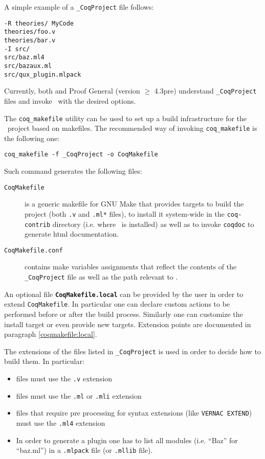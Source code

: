 A simple example of a {\tt \_CoqProject} file follows:

\begin{verbatim}
-R theories/ MyCode
theories/foo.v
theories/bar.v
-I src/
src/baz.ml4
src/bazaux.ml
src/qux_plugin.mlpack
\end{verbatim}

Currently, both \CoqIDE{} and Proof General (version $\geq$ 4.3pre) understand
{\tt \_CoqProject} files and invoke \Coq\ with the desired options.

The {\tt coq\_makefile} utility can be used to set up a build infrastructure
for the \Coq\ project based on makefiles.  The recommended way of
invoking {\tt coq\_makefile} is the following one:

\begin{verbatim}
coq_makefile -f _CoqProject -o CoqMakefile
\end{verbatim}

Such command generates the following files:
\begin{description}
	\item[{\tt CoqMakefile}] is a generic makefile for GNU Make that provides targets to build the project (both {\tt .v} and {\tt .ml*} files), to install it system-wide in the {\tt coq-contrib} directory (i.e. where \Coq\ is installed) as well as to invoke {\tt coqdoc} to generate html documentation.

	\item[{\tt CoqMakefile.conf}] contains make variables assignments that reflect the contents of the {\tt \_CoqProject} file as well as the path relevant to \Coq{}.
\end{description}

An optional file {\bf {\tt CoqMakefile.local}} can be provided by the user in order to extend {\tt CoqMakefile}.  In particular one can declare custom actions to be performed before or after the build process. Similarly one can customize the install target or even provide new targets.  Extension points are documented in paragraph \ref{coqmakefile:local}.

The extensions of the files listed in {\tt \_CoqProject} is
used in order to decide how to build them.  In particular:

\begin{itemize}
\item {\Coq} files must use the \texttt{.v} extension
\item {\ocaml} files must use the \texttt{.ml} or \texttt{.mli} extension
\item {\ocaml} files that require pre processing for syntax extensions (like {\tt VERNAC EXTEND}) must use the \texttt{.ml4} extension
\item In order to generate a plugin one has to list all {\ocaml} modules (i.e. ``Baz'' for ``baz.ml'') in a \texttt{.mlpack} file (or \texttt{.mllib} file).
\end{itemize}

